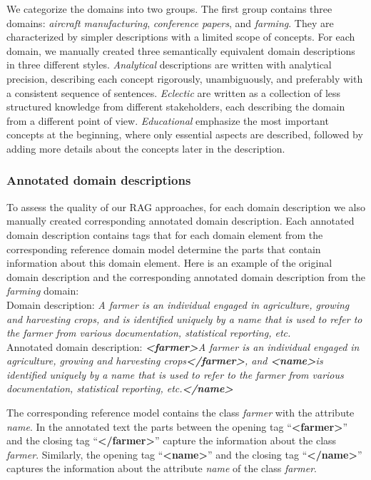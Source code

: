 We categorize the domains into two groups.
The first group contains three domains: \emph{aircraft manufacturing}, \emph{conference papers}, and \emph{farming}.
They are characterized by simpler descriptions with a limited scope of concepts.
For each domain, we manually created three semantically equivalent domain descriptions in three different styles.
\emph{Analytical} descriptions are written with analytical precision, describing each concept rigorously, unambiguously, and preferably with a consistent sequence of sentences.
\emph{Eclectic} are written as a collection of less structured knowledge from different stakeholders, each describing the domain from a different point of view.
\emph{Educational} emphasize the most important concepts at the beginning, where only essential aspects are described, followed by adding more details about the concepts later in the description.


\subsubsection{Annotated domain descriptions}

To assess the quality of our RAG approaches, for each domain description we also manually created corresponding annotated domain description. Each annotated domain description contains tags that for each domain element from the corresponding reference domain model determine the parts that contain information about this domain element. Here is an example of the original domain description and the corresponding annotated domain description from the \emph{farming} domain: \\

\noindent{}Domain description: \textit{A farmer is an individual engaged in agriculture, growing and harvesting crops, and is identified uniquely by a name that is used to refer to the farmer from various documentation, statistical reporting, etc.} \\

\noindent{}Annotated domain description: \textit{\textbf{<farmer>}A farmer is an individual engaged in agriculture, growing and harvesting crops\textbf{</farmer>}, and \textbf{<name>}is identified uniquely by a name that is used to refer to the farmer from various documentation, statistical reporting, etc.\textbf{</name>}}

The corresponding reference model contains the class \textit{farmer} with the attribute \textit{name}. In the annotated text the parts between the opening tag ``\textbf{<farmer>}'' and the closing tag ``\textbf{</farmer>}'' capture the information about the class \textit{farmer}. Similarly, the opening tag ``\textbf{<name>}'' and the closing tag ``\textbf{</name>}'' captures the information about the attribute \textit{name} of the class \textit{farmer}.

